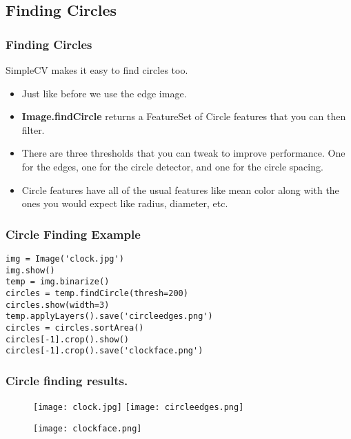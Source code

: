 \documentclass[compress]{beamer}
\begin{document}
\subsection{Finding Circles}
\begin{frame}
  \frametitle{Finding Circles}
SimpleCV makes it easy to find circles too.
\begin{itemize}
\item Just like before we use the edge image. 
\item \textbf{Image.findCircle} returns a FeatureSet of Circle features
  that you can then filter.
\item There are three thresholds that you can tweak to improve
  performance. One for the edges, one for the circle detector, and one
  for the circle spacing.
\item  Circle features have all of the usual features like mean color
  along with the ones you would expect like radius, diameter, etc. 
\end{itemize}
\end{frame}
\begin{frame}[fragile] 
\frametitle{Circle Finding Example}
\begin{example}
\begin{verbatim}
img = Image('clock.jpg')
img.show()
temp = img.binarize()
circles = temp.findCircle(thresh=200)
circles.show(width=3)
temp.applyLayers().save('circleedges.png')
circles = circles.sortArea()
circles[-1].crop().show()
circles[-1].crop().save('clockface.png')
\end{verbatim}
\end{example}
\end{frame} 
\begin{frame}
\frametitle{Circle finding results.}
 \begin{figure}
     \texttt{[image: clock.jpg]}
     \quad
     \texttt{[image: circleedges.png]}
 \end{figure}
 \begin{figure}
     \texttt{[image: clockface.png]}
 \end{figure}
\end{frame}
\end{document}
